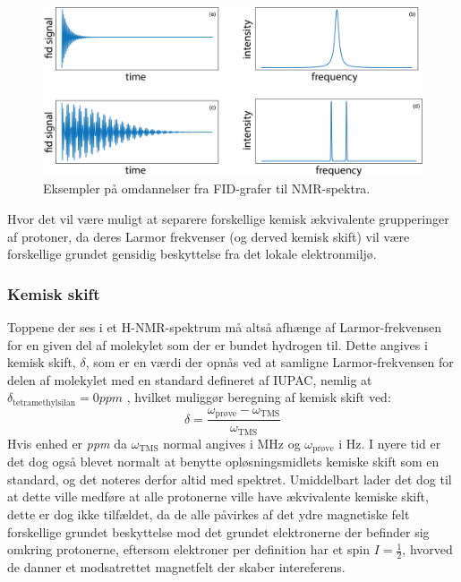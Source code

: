     \begin{figure}[H]\centering
        \includegraphics[width=\textwidth]{billeder/fourier}
        \caption{Eksempler på omdannelser fra FID-grafer til NMR-spektra.}
    \end{figure}
    Hvor det vil være muligt at separere forskellige kemisk ækvivalente grupperinger af protoner, da deres Larmor frekvenser (og derved kemisk skift) vil være forskellige grundet gensidig beskyttelse fra det lokale elektronmiljø.

    \subsubsection{Kemisk skift}
    Toppene der ses i et H-NMR-spektrum må altså afhænge af Larmor-frekvensen for en given del af molekylet som der er bundet hydrogen til. Dette angives i kemisk skift, $\delta$, som er en værdi der opnås ved at samligne Larmor-frekvensen for delen af molekylet med en standard defineret af IUPAC, nemlig at $\delta_{\text{tetramethylsilan}}=0\si{ppm}$ \parencite{Robi2009}, hvilket muliggør beregning af kemisk skift ved:
    \[
        \delta = \frac{\omega_{\text{prøve}}-\omega_{\text{TMS}}}{\omega_{\text{TMS}}}
    \]
    Hvis enhed er \textit{ppm} da $\omega_{\text{TMS}}$ normal angives i MHz og  $\omega_{\text{prøve}}$ i Hz. I nyere tid er det dog også blevet normalt at benytte opløsningsmidlets kemiske skift som en standard, og det noteres derfor altid med spektret. Umiddelbart lader det dog til at dette ville medføre at alle protonerne ville have ækvivalente kemiske skift, dette er dog ikke tilfældet, da de alle påvirkes af det ydre magnetiske felt forskellige grundet beskyttelse mod det grundet elektronerne der befinder sig omkring protonerne, eftersom elektroner per definition har et spin $I=\frac{1}{2}$, hvorved de danner et modsatrettet magnetfelt der skaber intereferens.

